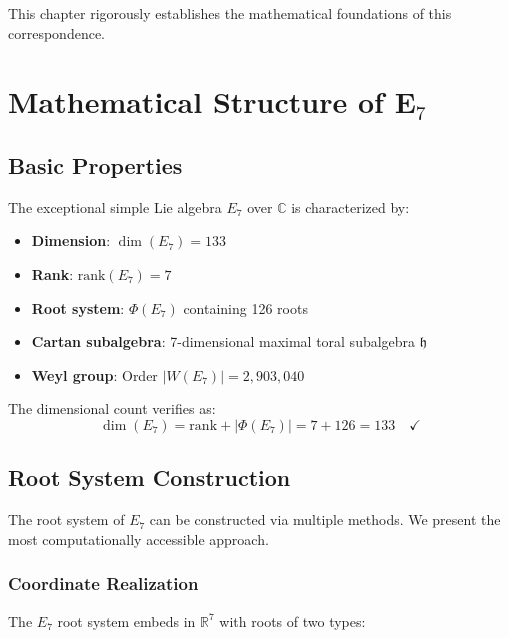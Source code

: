 This chapter rigorously establishes the mathematical foundations of this correspondence.

\section{Mathematical Structure of E$_7$}

\subsection{Basic Properties}

\begin{definition}
\label{def:e7_algebra}
The exceptional simple Lie algebra $E_7$ over $\mathbb{C}$ is characterized by:
\begin{itemize}
    \item \textbf{Dimension}: $\dim(E_7) = 133$
    \item \textbf{Rank}: $\text{rank}(E_7) = 7$
    \item \textbf{Root system}: $\Phi(E_7)$ containing 126 roots
    \item \textbf{Cartan subalgebra}: 7-dimensional maximal toral subalgebra $\mathfrak{h}$
    \item \textbf{Weyl group}: Order $|W(E_7)| = 2,903,040$
\end{itemize}
\end{definition}

The dimensional count verifies as:
\begin{equation}
\label{eq:e7_dimension}
\dim(E_7) = \text{rank} + |\Phi(E_7)| = 7 + 126 = 133 \quad \checkmark
\end{equation}

\subsection{Root System Construction}

The root system of $E_7$ can be constructed via multiple methods. We present the most computationally accessible approach.

\subsubsection{Coordinate Realization}

The $E_7$ root system embeds in $\mathbb{R}^7$ with roots of two types:

